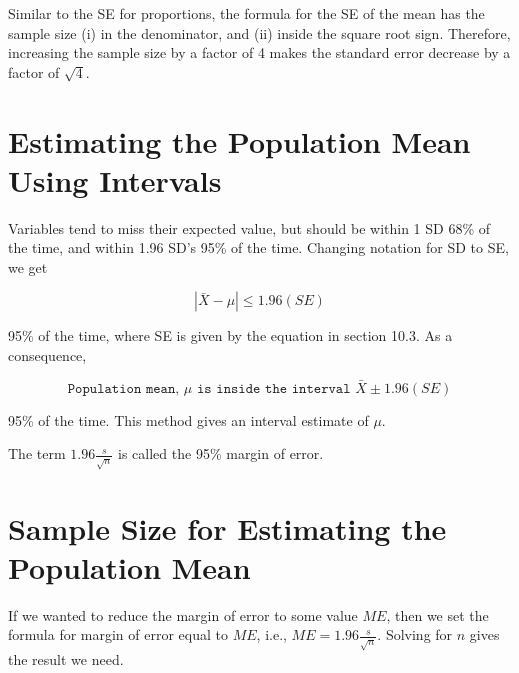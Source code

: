 \documentclass[11pt, chapterprefix=true]{scrbook}\usepackage[]{graphicx}\usepackage[]{color}
\begin{document}
Similar to the SE for proportions, the formula for the SE of the mean has the sample size (i) in the denominator, and (ii) inside the square root sign.  Therefore, increasing the sample size by a factor of 4 makes the standard error decrease by a factor of $\sqrt{4}$. 


\section{Estimating the Population Mean Using Intervals}

Variables tend to miss their expected value, but should be within 1 SD 68\% of the time, and within 1.96 SD's 95\% of the time. Changing notation for SD to SE, we get

\begin{equation*}
| \bar{X} - \mu | \le 1.96 (SE) 
\end{equation*}

95\% of the time, where SE is given by the equation in section 10.3.  As a consequence,

\begin{equation*}
\texttt{Population mean, } \mu \texttt{ is inside the interval } \bar{X} \pm 1.96 (SE) 
\end{equation*}

95\% of the time.  This method gives an interval estimate of $\mu$. 

\vspace{2mm}


\vspace{2mm}

The term $1.96 \frac{s}{\sqrt{n}}$ is called the 95\% margin of error.

\section{Sample Size for Estimating the Population Mean}

If we wanted to reduce the margin of error to some value $ME$, then we set the formula for margin of error equal to $ME$, i.e., $ME = 1.96 \frac{s}{\sqrt{n}}$.  Solving for $n$ gives the result we need.  
\end{document}

